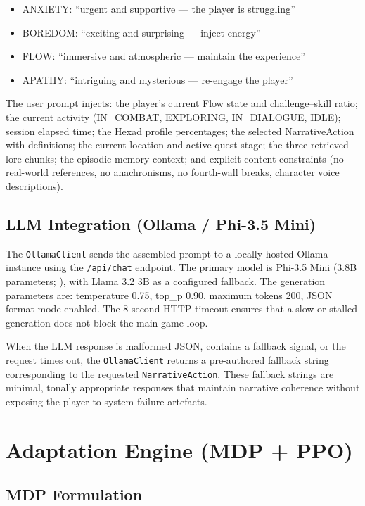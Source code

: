 \documentclass[12pt,a4paper]{report}
\begin{document}
\begin{itemize}
\item ANXIETY: ``urgent and supportive --- the player is struggling''
\item BOREDOM: ``exciting and surprising --- inject energy''
\item FLOW: ``immersive and atmospheric --- maintain the experience''
\item APATHY: ``intriguing and mysterious --- re-engage the player''
\end{itemize}

The user prompt injects: the player's current Flow state and challenge--skill ratio; the current activity (IN\_COMBAT, EXPLORING, IN\_DIALOGUE, IDLE); session elapsed time; the Hexad profile percentages; the selected NarrativeAction with definitions; the current location and active quest stage; the three retrieved lore chunks; the episodic memory context; and explicit content constraints (no real-world references, no anachronisms, no fourth-wall breaks, character voice descriptions).

\subsection{LLM Integration (Ollama / Phi-3.5 Mini)}

The \texttt{OllamaClient} sends the assembled prompt to a locally hosted Ollama instance using the \texttt{/api/chat} endpoint. The primary model is Phi-3.5 Mini (3.8B parameters; \citealp{microsoft2024phi}), with Llama 3.2 3B as a configured fallback. The generation parameters are: temperature 0.75, top\_p 0.90, maximum tokens 200, JSON format mode enabled. The 8-second HTTP timeout ensures that a slow or stalled generation does not block the main game loop.

When the LLM response is malformed JSON, contains a fallback signal, or the request times out, the \texttt{OllamaClient} returns a pre-authored fallback string corresponding to the requested \texttt{NarrativeAction}. These fallback strings are minimal, tonally appropriate responses that maintain narrative coherence without exposing the player to system failure artefacts.

\section{Adaptation Engine (MDP + PPO)}

\subsection{MDP Formulation}
\end{document}
